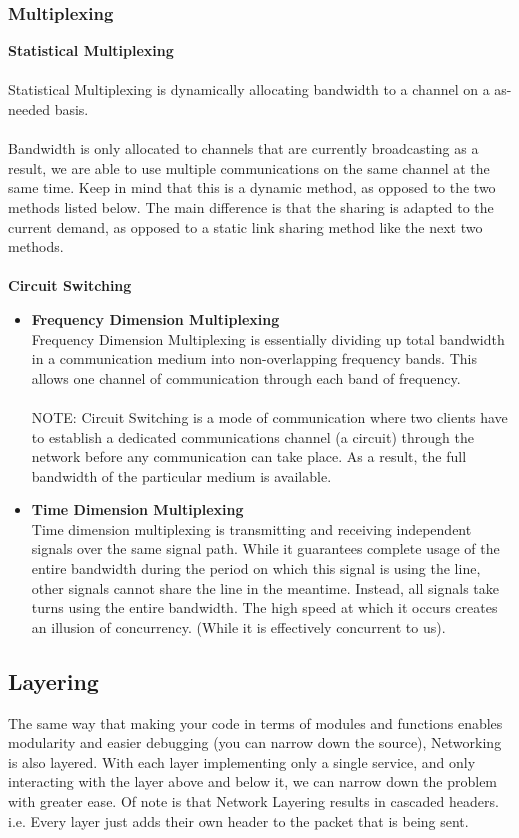 \documentclass{article}
\begin{document}
\subsubsection{Multiplexing}
\noindent \textbf{Statistical Multiplexing}\\\\
Statistical Multiplexing is dynamically allocating bandwidth to a channel on a as-needed basis. \\\\
Bandwidth is only allocated to channels that are currently broadcasting as a result, we are able to use multiple communications on the same channel at the same time. Keep in mind that this is a dynamic method, as opposed to the two methods listed below. The main difference is that the sharing is adapted to the current demand, as opposed to a static link sharing method like the next two methods.\\\\

\noindent \textbf{Circuit Switching}
\begin{itemize}
\item \textbf{Frequency Dimension Multiplexing}\\
Frequency Dimension Multiplexing is essentially dividing up total bandwidth in a communication medium into non-overlapping frequency bands. This allows one channel of communication through each band of frequency. \\\\
NOTE: Circuit Switching is a mode of communication where two clients have to establish a dedicated communications channel (a circuit) through the network before any communication can take place. As a result, the full bandwidth of the particular medium is available.

\item \textbf{Time Dimension Multiplexing}\\
Time dimension multiplexing is transmitting and receiving independent signals over the same signal path. While it guarantees complete usage of the entire bandwidth during the period on which this signal is using the line, other signals cannot share the line in the meantime. Instead, all signals take turns using the entire bandwidth. The high speed at which it occurs creates an illusion of concurrency. (While it is effectively concurrent to us).
\end{itemize}

\subsection{Layering}
The same way that making your code in terms of modules and functions enables modularity and easier debugging (you can narrow down the source), Networking is also layered. With each layer implementing only a single service, and only interacting with the layer above and below it, we can narrow down the problem with greater ease. Of note is that Network Layering results in cascaded headers. i.e. Every layer just adds their own header to the packet that is being sent.\\
\end{document}
